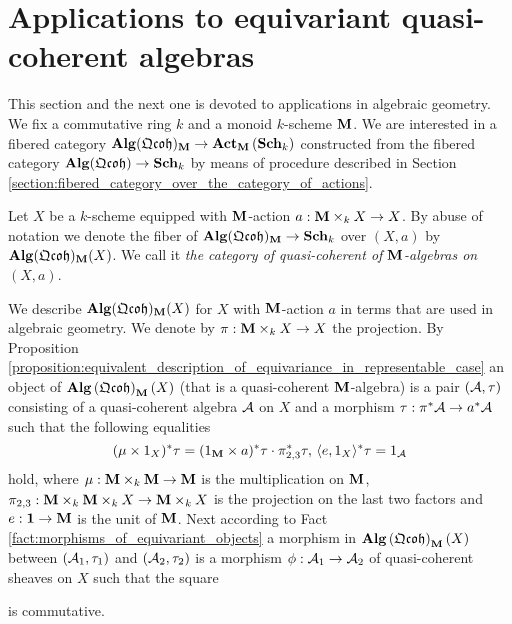 \section{Applications to equivariant quasi-coherent algebras}
\noindent
This section and the next one is devoted to applications in algebraic geometry. We fix a commutative ring $k$ and a monoid $k$-scheme $\mathbf{M}$. We are interested in a fibered category $\mathbf{Alg}(\mathfrak{Qcoh})_{\mathbf{M}}\rightarrow \mathbf{Act}_{\mathbf{M}}\left(\mathbf{Sch}_k\right)$ constructed from the fibered category $\mathbf{Alg}(\mathfrak{Qcoh})\rightarrow \mathbf{Sch}_k$ by means of procedure described in Section \ref{section:fibered_category_over_the_category_of_actions}. 

\begin{definition}
Let $X$ be a $k$-scheme equipped with $\mathbf{M}$-action $a:\mathbf{M}\times_kX\rightarrow X$. By abuse of notation we denote the fiber of $\mathbf{Alg}(\mathfrak{Qcoh})_{\mathbf{M}}\rightarrow \mathbf{Sch}_k$ over $(X,a)$ by $\mathbf{Alg}(\mathfrak{Qcoh})_{\mathbf{M}}(X)$. We call it \textit{the category of quasi-coherent of $\mathbf{M}$-algebras on $(X,a)$}.
\end{definition}

\begin{remark}\label{remark:description_of_equivariant_qc_algebras_in_the_usual_way}
We describe $\mathbf{Alg}(\mathfrak{Qcoh})_{\mathbf{M}}(X)$ for $X$ with $\mathbf{M}$-action $a$ in terms that are used in algebraic geometry. We denote by $\pi:\mathbf{M}\times_kX\rightarrow X$ the projection. By Proposition \ref{proposition:equivalent_description_of_equivariance_in_representable_case} an object of $\mathbf{Alg}\left(\mathfrak{Qcoh}\right)_{\mathbf{M}}(X)$ (that is a quasi-coherent $\mathbf{M}$-algebra) is a pair $({\mathcal A},\tau)$ consisting of a quasi-coherent algebra ${\mathcal A}$ on $X$ and a morphism $\tau:\pi^*{\mathcal A} \rightarrow a^* {\mathcal A}$ such that the following equalities
$$(\mu \times 1_X)^*\tau = (1_{\mathbf{M}} \times  a)^*\tau \cdot \pi_{2,3}^*\tau,\,\langle e, 1_{X} \rangle^*\tau = 1_{{\mathcal A}}$$
hold, where $\mu: \mathbf{M} \times_k \mathbf{M} \rightarrow \mathbf{M}$ is the multiplication on $\mathbf{M}$, $\pi_{2,3}:\mathbf{M}\times_k  \mathbf{M} \times_k  X \rightarrow \mathbf{M} \times_k X$ is the projection on the last two factors and $e:\mathbf{1}\rightarrow \mathbf{M}$ is the unit of $\mathbf{M}$. Next according to Fact \ref{fact:morphisms_of_equivariant_objects} a morphism in $\mathbf{Alg}\left(\mathfrak{Qcoh}\right)_{\mathbf{M}}(X)$ between $({\mathcal A}_1,\tau_1)$ and $({\mathcal A}_2,\tau_2)$ is a morphism $\phi:{\mathcal A}_1\rightarrow {\mathcal A}_2$ of quasi-coherent sheaves on $X$ such that the square
\begin{center}
\end{center}
is commutative.
\end{remark}

